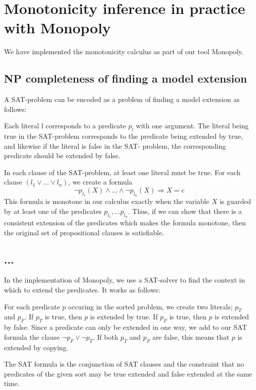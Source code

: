 \section{Monotonicity inference in practice with Monopoly}

We have implemented the monotonicity calculus as part of our tool
Monopoly.

\subsection{NP completeness of finding a model extension}

  A SAT-problem can be encoded as a problem of finding a model extension
  as follows:

  Each literal l corresponds to a predicate $p_l$ with one argument.
  The literal being true in the SAT-problem corresponds to the predicate
  being extended by true, and likewise if the literal is false in the SAT-
  problem, the corresponding predicate should be extended by false. 
  
  In each clause of the SAT-problem, at least one literal must be true.
  For each clause $(l_1 \vee ...\vee l_n)$, we create a formula
  $$ \neg p_{l_1}(X) \wedge ... \wedge \neg p_{l_n}(X) \Rightarrow X = c $$
  This formula is monotone in our calculus exactly when the variable $X$ 
  is guarded by at least one of the predicates $p_{l_1},...p_{l_n}$.
  Thus, if we can show that there is a consistent extension of the predicates
  which makes the formula monotone, then the original set of propositional 
  clauses is satisfiable.

\subsection{...}

  In the implementation of Monopoly, we use a SAT-solver to find the context 
  in which to extend the predicates. It works as follows:

  For each predicate $p$ occuring in the sorted problem, we create two literals;
  $p_T$ and $p_F$. If $p_T$ is true, then $p$  is extended by true. 
  If $p_F$ is true, then $p$ is extended by false. Since a predicate can only
  be extended in one way, we add to our SAT formula the clause $\neg p_F \vee \neg p_T$.
  If both $p_T$ and $p_F$ are false, this means that $p$ is extended by copying.

  The SAT formula is the conjunction of SAT clauses and the constraint that no 
  predicates of the given sort may be true extended and false extended at the same time.


